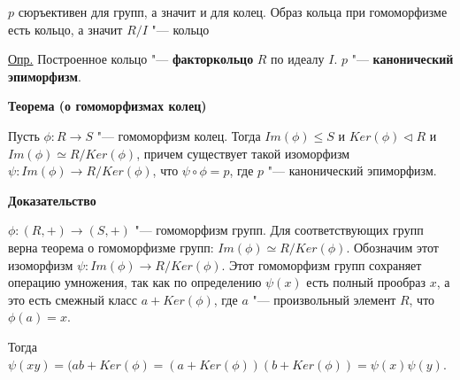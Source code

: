 \documentclass{article}
\begin{document}
$p$ сюръективен для групп, а значит и для колец. Образ кольца при гомоморфизме есть кольцо, а значит $R / I$ "--- кольцо

\vspace{10pt}

\underline{Опр.} Построенное кольцо "--- \textbf{факторкольцо} $R$ по идеалу $I$. $p$ "--- \textbf{канонический эпиморфизм}.

\vspace{10pt}

\textbf{Теорема (о гомоморфизмах колец)}

Пусть $\phi: R \rightarrow S$ "--- гомоморфизм колец. Тогда $Im(\phi) \leq S$ и $Ker(\phi) \triangleleft R$ и $Im(\phi) \simeq R / Ker(\phi)$, причем существует такой изоморфизм $\psi: Im(\phi) \rightarrow R / Ker(\phi)$, что $\psi \circ \phi = p$, где $p$ "--- канонический эпиморфизм.

\vspace{5pt}

\textbf{Доказательство}

$\phi: (R, +) \rightarrow (S, +)$ "--- гомоморфизм групп. Для соответствующих групп верна теорема о гомоморфизме групп: $Im(\phi) \simeq R / Ker(\phi)$. Обозначим этот изоморфизм $\psi: Im(\phi) \rightarrow R / Ker(\phi)$. Этот гомоморфизм групп сохраняет операцию умножения, так как по определению $\psi(x)$ есть полный прообраз $x$, а это есть смежный класс $a + Ker(\phi)$, где $a$ "--- произвольный элемент $R$, что $\phi(a) = x$. 

Тогда $\psi(xy) = (ab + Ker(\phi) = (a + Ker(\phi))(b + Ker(\phi)) = \psi(x)\psi(y)$.
\end{document}

